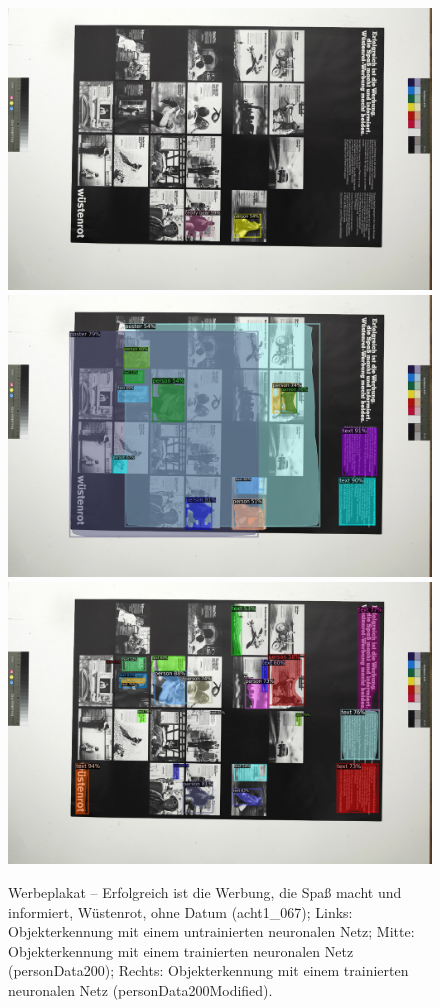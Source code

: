 \documentclass[a4paper,12pt,ngerman]{article}
\begin{document}
\newpage
\begin{landscape}
\begin{figure}[ht]
	\centering
	\includegraphics[width=0.49\linewidth, angle=90]{Abbildung_65a_(acht1_067)_with_detections}
	\centering
	\includegraphics[width=0.49\linewidth, angle=90]{Abbildung_65b_(acht1_067)_with_detections}
	\centering
	\includegraphics[width=0.49\linewidth, angle=90]{Abbildung_65c_(acht1_067)_with_detections}
	\caption{Werbeplakat – Erfolgreich ist die Werbung, die Spaß macht und informiert, Wüstenrot, ohne Datum (acht1\_067); Links: Objekterkennung mit einem untrainierten neuronalen Netz; Mitte: Objekterkennung mit einem trainierten neuronalen Netz (personData200); Rechts: Objekterkennung mit einem trainierten neuronalen Netz (personData200Modified).}
\end{figure}
\end{landscape}
\end{document}
